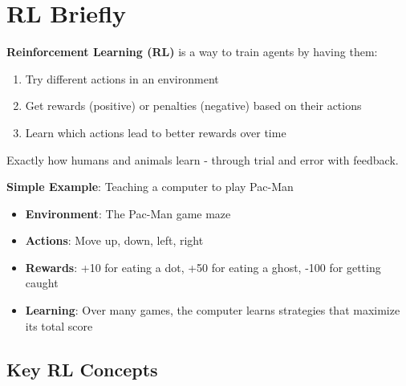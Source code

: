 \documentclass[11pt]{article}
\begin{document}
\section{RL Briefly}

\begin{foundation}
\textbf{Reinforcement Learning (RL)} is a way to train agents by having them:
\begin{enumerate}
\item Try different actions in an environment
\item Get rewards (positive) or penalties (negative) based on their actions
\item Learn which actions lead to better rewards over time
\end{enumerate}

Exactly how humans and animals learn - through trial and error with feedback.
\end{foundation}

\begin{example}
\textbf{Simple Example}: Teaching a computer to play Pac-Man
\begin{itemize}
\item \textbf{Environment}: The Pac-Man game maze
\item \textbf{Actions}: Move up, down, left, right
\item \textbf{Rewards}: +10 for eating a dot, +50 for eating a ghost, -100 for getting caught
\item \textbf{Learning}: Over many games, the computer learns strategies that maximize its total score
\end{itemize}
\end{example}

\subsection{Key RL Concepts}
\end{document}
